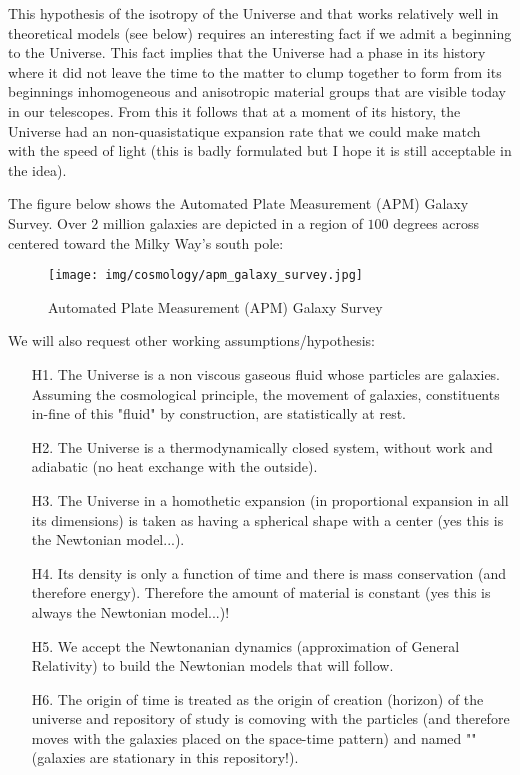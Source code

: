 	\begin{tcolorbox}[title=Remark,colframe=black,arc=10pt]
	This hypothesis of the isotropy of the Universe and that works relatively well in theoretical models (see below) requires an interesting fact if we admit a beginning to the Universe. This fact implies that the Universe had a phase in its history where it did not leave the time to the matter to clump together to form from its beginnings inhomogeneous and anisotropic material groups that are visible today in our telescopes. From this it follows that at a moment of its history, the Universe had an non-quasistatique expansion rate that we could make match with the speed of light (this is badly formulated but I hope it is still acceptable in the idea).
	\end{tcolorbox}
	The figure below shows the Automated Plate Measurement (APM) Galaxy Survey. Over $2$ million galaxies are depicted in a region of $100$
degrees across centered toward the Milky Way's south pole:
	\begin{figure}[H]
		\begin{center}
		\texttt{[image: img/cosmology/apm\_galaxy\_survey.jpg]}
		\end{center}	
		\caption{Automated Plate Measurement (APM) Galaxy Survey}
	\end{figure}
	We will also request other working assumptions/hypothesis:
	\begin{itemize}
		\item[H1.] The Universe is a non viscous gaseous fluid whose particles are galaxies. Assuming the cosmological principle, the movement of galaxies, constituents in-fine of this "fluid" by construction, are statistically at rest.
		
		\item[H2.] The Universe is a thermodynamically closed system, without work and adiabatic (no heat exchange with the outside).
		
		\item[H3.] The Universe in a homothetic expansion (in proportional expansion in all its dimensions) is taken as having a spherical shape with a center (yes this is the Newtonian model...).
		
		\item[H4.] Its density is only a function of time and there is mass conservation (and therefore energy). Therefore the amount of material is constant (yes this is always the Newtonian model...)!
		
		\item[H5.] We accept the Newtonanian dynamics (approximation of General Relativity) to build the Newtonian models that will follow.
		
		\item[H6.] The origin of time is treated as the origin of creation (horizon) of the universe and repository of study is comoving with the particles (and therefore moves with the galaxies placed on the space-time pattern) and named "" (galaxies are stationary in this repository!).
	\end{itemize}

